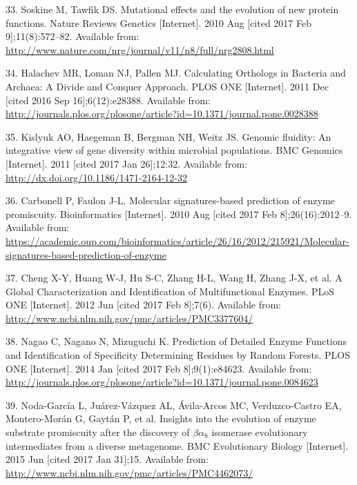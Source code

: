 \documentclass[12pt,twoside]{reedthesis}
\begin{document}
{  \hypertarget{ref-soskine_mutational_2010}{}
  33. Soskine M, Tawfik DS. Mutational effects and the evolution of new
  protein functions. Nature Reviews Genetics {[}Internet{]}. 2010 Aug
  {[}cited 2017 Feb 9{]};11(8):572--82. Available from:
  \url{http://www.nature.com/nrg/journal/v11/n8/full/nrg2808.html}
  
  \hypertarget{ref-halachev_calculating_2011}{}
  34. Halachev MR, Loman NJ, Pallen MJ. Calculating Orthologs in Bacteria
  and Archaea: A Divide and Conquer Approach. PLOS ONE {[}Internet{]}.
  2011 Dec {[}cited 2016 Sep 16{]};6(12):e28388. Available from:
  \url{http://journals.plos.org/plosone/article?id=10.1371/journal.pone.0028388}
  
  \hypertarget{ref-kislyuk_genomic_2011}{}
  35. Kislyuk AO, Haegeman B, Bergman NH, Weitz JS. Genomic fluidity: An
  integrative view of gene diversity within microbial populations. BMC
  Genomics {[}Internet{]}. 2011 {[}cited 2017 Jan 26{]};12:32. Available
  from: \url{http://dx.doi.org/10.1186/1471-2164-12-32}
  
  \hypertarget{ref-carbonell_molecular_2010}{}
  36. Carbonell P, Faulon J-L. Molecular signatures-based prediction of
  enzyme promiscuity. Bioinformatics {[}Internet{]}. 2010 Aug {[}cited
  2017 Feb 8{]};26(16):2012--9. Available from:
  \url{https://academic.oup.com/bioinformatics/article/26/16/2012/215921/Molecular-signatures-based-prediction-of-enzyme}
  
  \hypertarget{ref-cheng_global_2012}{}
  37. Cheng X-Y, Huang W-J, Hu S-C, Zhang H-L, Wang H, Zhang J-X, et al. A
  Global Characterization and Identification of Multifunctional Enzymes.
  PLoS ONE {[}Internet{]}. 2012 Jun {[}cited 2017 Feb 8{]};7(6). Available
  from: \url{http://www.ncbi.nlm.nih.gov/pmc/articles/PMC3377604/}
  
  \hypertarget{ref-nagao_prediction_2014}{}
  38. Nagao C, Nagano N, Mizuguchi K. Prediction of Detailed Enzyme
  Functions and Identification of Specificity Determining Residues by
  Random Forests. PLOS ONE {[}Internet{]}. 2014 Jan {[}cited 2017 Feb
  8{]};9(1):e84623. Available from:
  \url{http://journals.plos.org/plosone/article?id=10.1371/journal.pone.0084623}
  
  \hypertarget{ref-noda-garcia_insights_2015}{}
  39. Noda-García L, Juárez-Vázquez AL, Ávila-Arcos MC, Verduzco-Castro
  EA, Montero-Morán G, Gaytán P, et al. Insights into the evolution of
  enzyme substrate promiscuity after the discovery of \(\beta\alpha_8\)
  isomerase evolutionary intermediates from a diverse metagenome. BMC
  Evolutionary Biology {[}Internet{]}. 2015 Jun {[}cited 2017 Jan
  31{]};15. Available from:
  \url{http://www.ncbi.nlm.nih.gov/pmc/articles/PMC4462073/}
  
}
\end{document}
